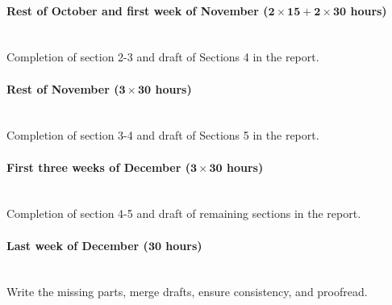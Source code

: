 \documentclass{article}
\newcommand{\timeest}[1]{$\mathbf{#1}$}%
\begin{document}
\paragraph{Rest of October and first week of November (\timeest{2\times 15+2\times 30} hours)}~\\\noindent
Completion of section 2-3 and draft of Sections 4 in the report.

\paragraph{Rest of November (\timeest{3\times 30} hours)}~\\\noindent
Completion of section 3-4 and draft of Sections 5 in the report.

\paragraph{First three weeks of December (\timeest{3\times 30} hours)}~\\\noindent
Completion of section 4-5 and draft of remaining sections in the report.

\paragraph{Last week of December (\timeest{30} hours)}~\\\noindent
Write the missing parts, merge drafts, ensure consistency, and proofread.
\end{document}
